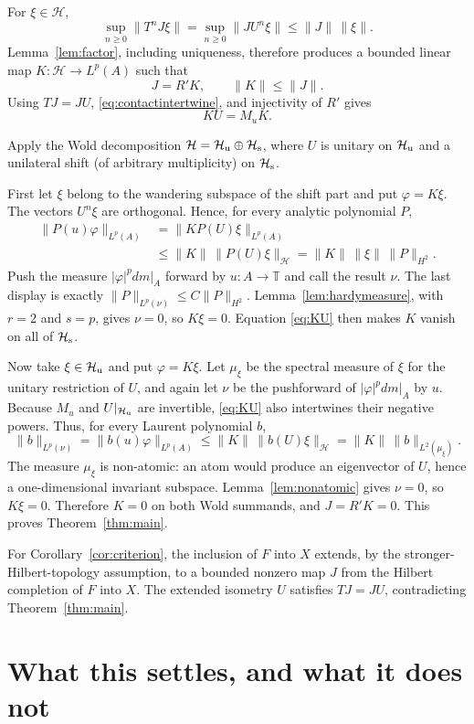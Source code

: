 \documentclass[11pt]{article}
\newcommand{\T}{\mathbb T}
\begin{document}
For $\xi\in\mathcal H$,
\[
 \sup_{n\ge0}\|T^nJ\xi\|
 =\sup_{n\ge0}\|JU^n\xi\|
 \le\|J\|\,\|\xi\|.
\]
Lemma~\ref{lem:factor}, including uniqueness, therefore produces a bounded
linear map $K:\mathcal H\to L^p(A)$ such that
\[
 J=R'K,\qquad \|K\|\le\|J\|.
\]
Using $TJ=JU$, \eqref{eq:contactintertwine}, and injectivity of $R'$ gives
\[
 KU=M_uK.
 \tag{5.1}\label{eq:KU}
\]

Apply the Wold decomposition
$\mathcal H=\mathcal H_{\rm u}\oplus\mathcal H_{\rm s}$, where $U$ is
unitary on $\mathcal H_{\rm u}$ and a unilateral shift (of arbitrary
multiplicity) on $\mathcal H_{\rm s}$.

First let $\xi$ belong to the wandering subspace of the shift part and put
$\varphi=K\xi$.  The vectors $U^n\xi$ are orthogonal.  Hence, for every
analytic polynomial $P$,
\begin{align*}
 \|P(u)\varphi\|_{L^p(A)}
 &=\|KP(U)\xi\|_{L^p(A)} \\
 &\le\|K\|\,\|P(U)\xi\|_{\mathcal H}
 =\|K\|\,\|\xi\|\,\|P\|_{H^2}.
\end{align*}
Push the measure $|\varphi|^pdm|_A$ forward by $u:A\to\T$ and call the
result $\nu$.  The last display is exactly
$\|P\|_{L^p(\nu)}\le C\|P\|_{H^2}$.  Lemma~\ref{lem:hardymeasure}, with
$r=2$ and $s=p$, gives $\nu=0$, so $K\xi=0$.  Equation \eqref{eq:KU}
then makes $K$ vanish on all of $\mathcal H_{\rm s}$.

Now take $\xi\in\mathcal H_{\rm u}$ and put $\varphi=K\xi$.  Let $\mu_\xi$
be the spectral measure of $\xi$ for the unitary restriction of $U$,
and again let $\nu$ be the pushforward of $|\varphi|^pdm|_A$ by $u$.
Because $M_u$ and $U|_{\mathcal H_{\rm u}}$ are invertible,
\eqref{eq:KU} also intertwines their negative powers.  Thus, for every
Laurent polynomial $b$,
\[
 \|b\|_{L^p(\nu)}=\|b(u)\varphi\|_{L^p(A)}
 \le\|K\|\,\|b(U)\xi\|_{\mathcal H}
 =\|K\|\,\|b\|_{L^2(\mu_\xi)}.
\]
The measure $\mu_\xi$ is non-atomic: an atom would produce an eigenvector of
$U$, hence a one-dimensional invariant subspace.  Lemma~\ref{lem:nonatomic}
gives $\nu=0$, so $K\xi=0$.  Therefore $K=0$ on both Wold summands, and
$J=R'K=0$.  This proves Theorem~\ref{thm:main}.

For Corollary~\ref{cor:criterion}, the inclusion of $F$ into $X$ extends,
by the stronger-Hilbert-topology assumption, to a bounded nonzero map $J$
from the Hilbert completion of $F$ into $X$.  The extended isometry $U$
satisfies $TJ=JU$, contradicting Theorem~\ref{thm:main}.

\section{What this settles, and what it does not}
\end{document}
